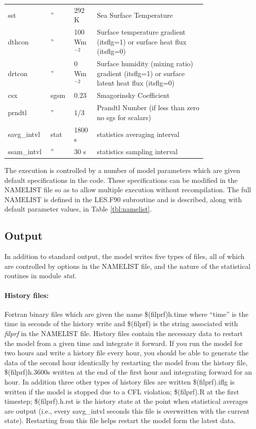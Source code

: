 \documentclass[11pt,a4paper]{article}
\begin{document}
\begin{longtable}[htb]{p{0.1\linewidth}p{0.1\linewidth}p{0.1\linewidth}p{0.5\linewidth}}
 sst       & '' & 292 K &  Sea Surface Temperature \\
 dthcon    & '' &100 Wm$^{-2}$ &  Surface temperature gradient
 (itsflg=1) or surface heat flux (itsflg=0) \\
 drtcon    & '' &0   Wm$^{-2}$ &   Surface humidity (mixing ratio) gradient
 (itsflg=1) or surface latent heat flux (itsflg=0) \\ \hline
 csx       & sgsm &  0.23   &  Smagorinsky Coefficient \\
 prndtl    &  '' &  1/3    &  Prandtl Number (if less than zero no sgs for
 scalars) \\ \hline
savg\_intvl& stat & 1800 s    &  statistics averaging interval \\
ssam\_intvl&  '' &  30 s  &  statistics sampling interval
\\ \hline
\end{longtable}

The execution is controlled by a number of model parameters which are
given default specifications in the code. These specifications can be
modified in the NAMELIST file so as to allow multiple execution
without recompilation.  The full NAMELIST is defined in the LES.F90
subroutine and is described, along with default parameter values, in
Table \ref{tbl:namelist}.

\subsection{Output}

In addition to standard output, the model writes five types of files,
all of which are controlled by options in the NAMELIST file, and the
nature of the statistical routines in module \emph{stat}.

\paragraph{History files:} Fortran binary files which are given the name
\$(filprf)h.time where ``time'' is the time in seconds of the history
write and \$(filprf) is the string associated with \emph{filprf} in
the NAMELIST file.  History files contain the necessary data to
restart the model from a given time and integrate it forward.  If you
run the model for two hours and write a history file every hour, you
should be able to generate the data of the second hour identically by
restarting the model from the history file, \$(filprf)h.3600s written
at the end of the first hour and integrating forward for an hour.  In
addition three other types of history files are written
\$(filprf).iflg is written if the model is stopped due to a CFL
violation; \$(filprf).R at the first timestep; \$(filprf).h.rst is the
history state at the point when statistical averages are output (i.e.,
every savg\_intvl seconds this file is overwritten with the current
state).  Restarting from this file helps restart the model form the
latest data.
\end{document}
